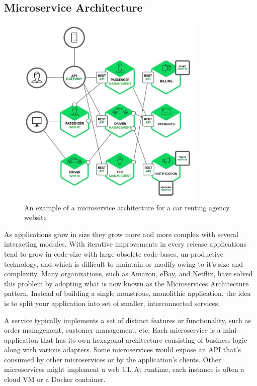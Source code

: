 \subsection{Microservice Architecture}

\begin{figure}[h!]
	\begin{center}
		\includegraphics[width=0.8\textwidth]{guided/figs/microservice.pdf}
		\caption{An example of a microservice architecture for a car renting agency website}
		\label{fig:microservice}
	\end{center}
\end{figure}

As applications grow in size they grow more and more complex with several interacting modules. 
With iterative improvements in every release applications tend to grow in code-size with large obsolete code-bases, un-productive technology, and which is difficult to maintain or modify owing to it's size and complexity.
Many organizations, such as Amazon, eBay, and Netflix, have solved this problem by adopting what is now known as the Microservices Architecture pattern. Instead of building a single monstrous, monolithic application, the idea is to split your application into set of smaller, interconnected services.

A service typically implements a set of distinct features or functionality, such as order management, customer management, etc. Each microservice is a mini-application that has its own hexagonal architecture consisting of business logic along with various adapters. Some microservices would expose an API that’s consumed by other microservices or by the application’s clients. Other microservices might implement a web UI. At runtime, each instance is often a cloud VM or a Docker container.

